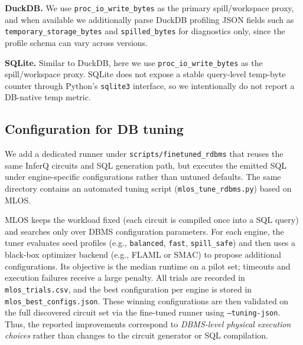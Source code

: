 \noindent\textbf{DuckDB.} We use \texttt{proc\_\allowbreak io\_\allowbreak write\_\allowbreak bytes} as the primary spill/workspace proxy, and when available we additionally parse DuckDB profiling JSON fields such as \texttt{temporary\_\allowbreak storage\_\allowbreak bytes} and \texttt{spilled\_\allowbreak bytes} for diagnostics only, since the profile schema can vary across versions.

\noindent\textbf{SQLite.} Similar to DuckDB, here we use \texttt{proc\_\allowbreak io\_\allowbreak write\_\allowbreak bytes} as the spill/workspace proxy. SQLite does not expose a stable query-level temp-byte counter through Python’s \texttt{sqlite3} interface, so we intentionally do not report a DB-native temp metric.


\subsection{Configuration for DB tuning}
\label{app:mlos-runner}
We add a dedicated runner under \texttt{scripts/finetuned\_rdbms} that reuses the same
InferQ circuits and SQL generation path, but executes the emitted SQL under
engine-specific configurations rather than untuned defaults. The same directory contains
an automated tuning script (\texttt{mlos\_tune\_rdbms.py}) based on MLOS.

MLOS keeps the workload fixed (each circuit is compiled once into a SQL
query) and searches only over DBMS configuration parameters. For each engine, the tuner
evaluates seed profiles (e.g., \texttt{balanced}, \texttt{fast}, \texttt{spill\_safe})
and then uses a black-box optimizer backend (e.g., FLAML or SMAC) to propose additional
configurations. Its objective is the median runtime on a pilot set; timeouts and
execution failures receive a large penalty. All trials are recorded in
\texttt{mlos\_trials.csv}, and the best configuration per engine is stored in
\texttt{mlos\_best\_configs.json}. These winning configurations are then validated on the
full discovered circuit set via the fine-tuned runner using \texttt{--tuning-json}. Thus,
the reported improvements correspond to \emph{DBMS-level physical execution choices}
rather than changes to the circuit generator or SQL compilation.




